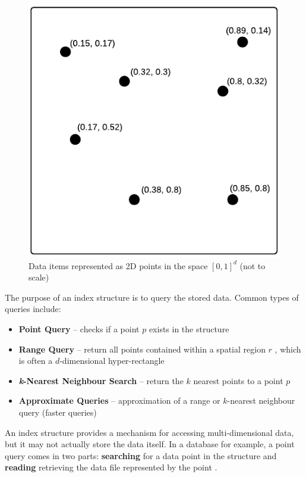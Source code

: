 \begin{figure}
	\vspace{-22pt}
	\begin{center}
		\includegraphics[scale=0.6]{figures/2D_data_space.pdf}
	\end{center}
	\vspace{-15pt}
	\caption{Data items represented as 2D points in the space $[0, 1]^d$ (not to scale)}
	\label{fig:data-space}
\end{figure}

The purpose of an index structure is to query the stored data. Common types of queries include:
\begin{itemize}
	\item \textbf{Point Query} -- checks if a point $p$ exists in the structure \cite{rplus-tree}
	\item \textbf{Range Query} -- return all points contained within a spatial region $r$ \cite{rplus-tree}, which is often a $d$-dimensional hyper-rectangle \cite{r-tree, pk-tree, pyramid-tree}
	\item \textbf{\textit{k}-Nearest Neighbour Search} -- return the $k$ nearest points to a point $p$ \cite{pk-tree}
	\item \textbf{Approximate Queries} -- approximation of a range or $k$-nearest neighbour query (faster queries) \cite{splay-quadtree} 
\end{itemize}

An index structure provides a mechanism for accessing multi-dimensional data, but it may not actually store the data itself. In a database for example, a point query comes in two parts: \textbf{searching} for a data point in the structure and \textbf{reading} retrieving the data file represented by the point \cite{rsr-tree}.
